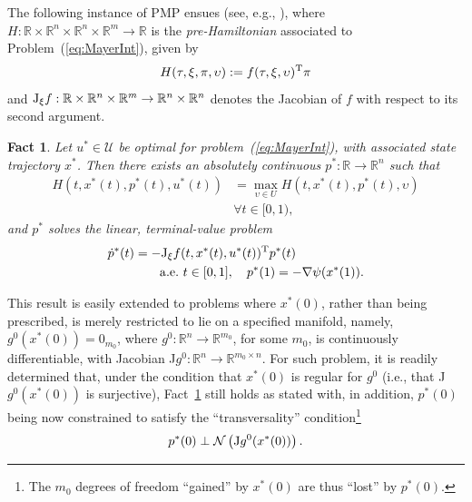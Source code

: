 \documentclass[letterpaper,10pt,conference]{ieeeconf}
\def\R{{\mathbb{R}}}
\newtheorem{fact}{Fact}
\begin{document}
The following instance of PMP ensues
(see, e.g., \cite[section VIII.1, Theorem 2]{Varaiya72:0}),
where $H:\R\times\R^n\times\R^n\times\R^m\to\R$ 
is the {\em pre-Hamiltonian} 
associated to Problem~(\ref{eq:MayerInt}), given by
\[
H(\tau,\xi,\pi,\upsilon):=f(\tau,\xi,\upsilon)^{\rm T}\pi
\]
and
${\rm J}_\xi f:\R\times\R^n\times\R^m\to\R^n\times\R^n$ denotes
the Jacobian of $f$ with respect to its second argument.
\begin{fact}                                                
\label{thm:FreeTerminalPoint}
Let $u^*\in\mathcal U$ be optimal for problem~(\ref{eq:MayerInt}), 
with associated state trajectory $x^*$.  
Then there exists an
absolutely continuous $p^*:\R\to\R^n$ such that
\[
\begin{aligned}
H(t,x^*(t),p^*(t),u^*(t)) &= 
\max_{\upsilon\in U} H(t,x^*(t),p^*(t),\upsilon)\\
&\forall t\in[0,1),
\end{aligned}
\]
and $p^*$ solves the linear, terminal-value problem
\[
\begin{aligned}
\dot p^*(t) &= -{\rm J}_{\xi}f(t,x^*(t),u^*(t))^{\rm T}p^*(t)\\
&\qquad {\rm a.e.~}t\in[0,1],\quad p^*(1)=-\nabla\psi(x^*(1)).
\end{aligned}
\]


\end{fact}

\noindent
This result is easily extended to problems where $x^*(0)$, rather
than being prescribed, is merely restricted to lie on a specified manifold,
namely, $g^0(x^*(0))=0_{m_0}$, where 
$g^0:\R^n\to\R^{m_0}$, for some $m_0$, is continuously differentiable,
with Jacobian J$g^0:\R^n\to\R^{m_0\times n}$.
For such problem, it is readily
determined 
that, under the condition 
that $x^*(0)$ is regular for $g^0$ (i.e., that
J$g^0(x^*(0))$ is surjective),
Fact~\ref{thm:FreeTerminalPoint} still holds as stated with, 
in addition, $p^*(0)$ being now constrained to satisfy the 
``transversality'' condition\footnote{The $m_0$ degrees 
of freedom ``gained'' by $x^*(0)$ are thus ``lost'' by $p^*(0)$.}
\[
p^*(0)\perp{\mathcal N}\left({\rm J}g^0(x^*(0))\right).
\]
\end{document}
